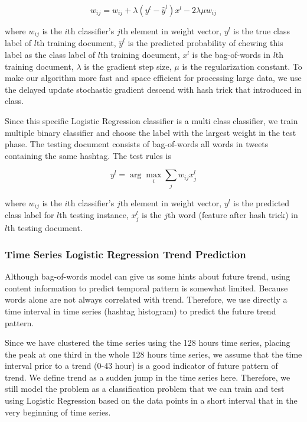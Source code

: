 \documentclass{article}
\begin{document}
\begin{equation} 
w_{ij}=w_{ij} + \lambda(y^l - \hat{y}^l) x^l - 2\lambda \mu w_{ij} \label{eq:lrtrain}
\end{equation}

where $w_{ij}$ is the $i$th classifier's $j$th element in weight vector, $y^l$ is the true class label of $l$th training document, $\hat{y}^l$ is the predicted probability of chewing this label as the class label of $l$th training document, $x^l$ is the bag-of-words in $l$th training document,  $\lambda$ is the gradient step size, $\mu$ is the regularization constant. To make our algorithm more fast and space efficient for processing large data, we use the delayed update stochastic gradient descend with hash trick that introduced in class. 

Since this specific Logistic Regression classifier is a multi class classifier, we train multiple binary classifier and choose the label with the largest weight in the test phase. The testing document consists of bag-of-words all words in tweets containing the same hashtag. The test rules is    

\begin{equation} 
y^l =\arg\max_i  \sum_j w_{ij} x_j^l\label{eq:lrtest}
\end{equation}

where $w_{ij}$ is the $i$th classifier's $j$th element in weight vector, $y^l$ is the predicted class label for $l$th testing instance, $x_j^l$ is the $j$th word (feature after hash trick) in $l$th testing document. 

\subsubsection{Time Series Logistic Regression Trend Prediction}

Although bag-of-words model can give us some hints about future trend, using content information to predict temporal pattern is somewhat limited. Because words alone are not always correlated with trend. Therefore, we use directly a time interval in time series (hashtag histogram) to predict the future trend pattern. 

Since we have clustered the time series using the 128 hours time series, placing the peak at one third in the whole 128 hours time series, we assume that the time interval prior to a trend (0-43 hour) is a good indicator of future pattern of trend. We define trend as a sudden jump in the time series here. Therefore, we still model the problem as a classification problem that we can train and test using Logistic Regression based on the data points in a short interval that in the very beginning of time series. 
\end{document}
